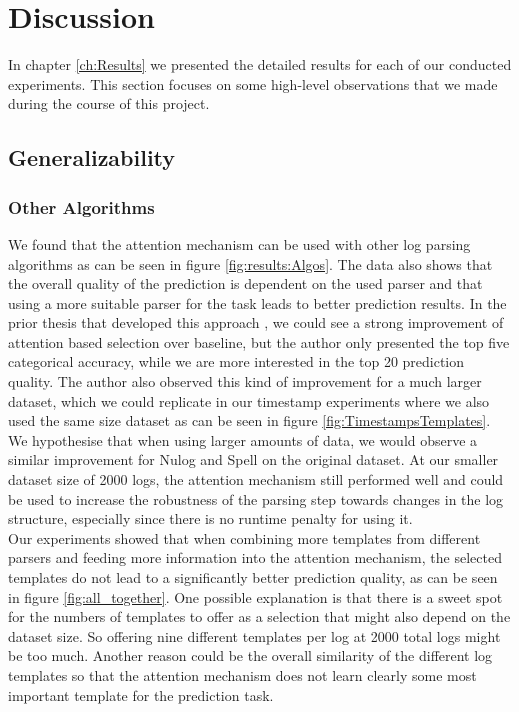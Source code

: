 \chapter{Discussion}
\label{ch:Discussion}
In chapter \ref{ch:Results} we presented the detailed results for each of our conducted experiments. This section focuses on some high-level observations that we made during the course of this project. 

\section{Generalizability}
\subsection{Other Algorithms}
We found that the attention mechanism can be used with other log parsing algorithms as can be seen in figure \ref{fig:results:Algos}. The data also shows that the overall quality of the prediction is dependent on the used parser and that using a more suitable parser for the task leads to better prediction results. In the prior thesis that developed this approach \cite{witterauf2021domainml}, we could see a strong improvement of attention based selection over baseline, but the author only presented the top five categorical accuracy, while we are more interested in the top 20 prediction quality. The author also observed this kind of improvement for a much larger dataset, which we could replicate in our timestamp experiments where we also used the same size dataset as can be seen in figure \ref{fig:TimestampsTemplates}. We hypothesise that when using larger amounts of data, we would observe a similar improvement for Nulog and Spell on the original dataset. At our smaller dataset size of 2000 logs, the attention mechanism still performed well and could be used to increase the robustness of the parsing step towards changes in the log structure, especially since there is no runtime penalty for using it. \\

Our experiments showed that when combining more templates from different parsers and feeding more information into the attention mechanism, the selected templates do not lead to a significantly better prediction quality, as can be seen in figure \ref{fig:all_together}. One possible explanation is that there is a sweet spot for the numbers of templates to offer as a selection that might also depend on the dataset size. So offering nine different templates per log at 2000 total logs might be too much. Another reason could be the overall similarity of the different log templates so that the attention mechanism does not learn clearly some most important template for the prediction task. \\



